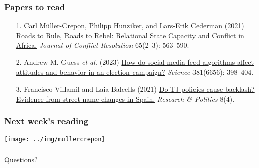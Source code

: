 \documentclass[aspectratio=43]{beamer}
\begin{document}
\begin{frame}
\frametitle{Papers to read}
\centering

\begin{itemize}
  \item[1.] Carl Müller-Crepon, Philipp Hunziker, and Lars-Erik Cederman (2021) \href{https://journals.sagepub.com/doi/10.1177/0022002720963674}{Roads to Rule, Roads to Rebel: Relational State Capacity and Conflict in Africa.} \textit{Journal of Conflict Resolution} 65(2--3): 563--590.
  \item[2.] Andrew M. Guess \textit{et al.} (2023) \href{https://www.science.org/doi/10.1126/science.abp9364}{How do social media feed algorithms affect attitudes and behavior in an election campaign?} \textit{Science} 381(6656): 398--404.
  \item[3.] Francisco Villamil and Laia Balcells (2021) \href{https://journals.sagepub.com/doi/full/10.1177/20531680211058550}{Do TJ policies cause backlash? Evidence from street name changes in Spain.} \textit{Research \& Politics} 8(4).
\end{itemize}

\end{frame}

\begin{frame}
\frametitle{Next week's reading}
\centering

\texttt{[image: ../img/mullercrepon]}

\end{frame}

\begin{frame}
\frametitle{}
\centering

Questions?

\end{frame}


\end{document}
